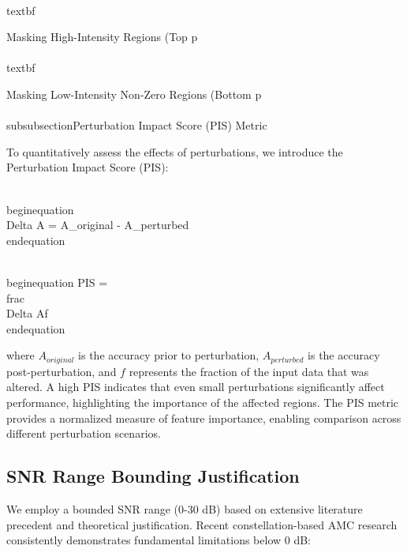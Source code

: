 \documentclass{ELSP}
\begin{document}
\\textbf{Masking High-Intensity Regions (Top p\\%

\\textbf{Masking Low-Intensity Non-Zero Regions (Bottom p\\%

\\subsubsection{Perturbation Impact Score (PIS) Metric}

To quantitatively assess the effects of perturbations, we introduce the Perturbation Impact Score (PIS):

\\begin{equation}
\\Delta A = A_{original} - A_{perturbed}
\\end{equation}

\\begin{equation}
PIS = \\frac{\\Delta A}{f}
\\end{equation}

where $A_{original}$ is the accuracy prior to perturbation, $A_{perturbed}$ is the accuracy post-perturbation, and $f$ represents the fraction of the input data that was altered. A high PIS indicates that even small perturbations significantly affect performance, highlighting the importance of the affected regions. The PIS metric provides a normalized measure of feature importance, enabling comparison across different perturbation scenarios.

\subsection{SNR Range Bounding Justification}

We employ a bounded SNR range (0-30 dB) based on extensive literature precedent and theoretical justification. Recent constellation-based AMC research consistently demonstrates fundamental limitations below 0 dB:

}}
\end{document}
